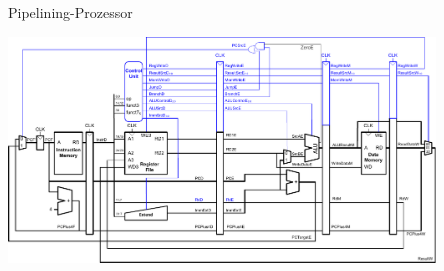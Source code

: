 \documentclass[
  german,            %
  aspectratio=169,    %
]{tumbeamer}
\begin{document}
\begin{frame}[fragile, c]{Pipelining-Prozessor}{}
	\begin{center}
		\includegraphics[width=0.85\textwidth]{w11_pipelined.pdf}
	\end{center}
\end{frame}
\end{document}
